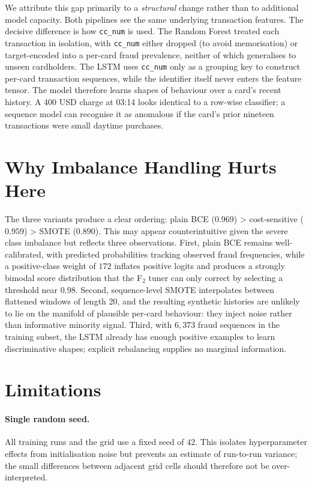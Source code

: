 \documentclass[oneside,12pt,parskip=half,american,numbers=noenddot]{scrreprt}
\begin{document}
We attribute this gap primarily to a \emph{structural} change rather than to additional model capacity. Both pipelines see the same underlying transaction features. The decisive difference is how \texttt{cc\_num} is used. The Random Forest treated each transaction in isolation, with \texttt{cc\_num} either dropped (to avoid memorisation) or target-encoded into a per-card fraud prevalence, neither of which generalises to unseen cardholders. The LSTM uses \texttt{cc\_num} only as a grouping key to construct per-card transaction sequences, while the identifier itself never enters the feature tensor. The model therefore learns shapes of behaviour over a card's recent history. A 400 USD charge at 03:14 looks identical to a row-wise classifier; a sequence model can recognise it as anomalous if the card's prior nineteen transactions were small daytime purchases.

\section{Why Imbalance Handling Hurts Here}
\label{sec:imbalance_discussion}

The three variants produce a clear ordering: plain BCE ($0.969$) > cost-sensitive ($0.959$) > SMOTE ($0.890$). This may appear counterintuitive given the severe class imbalance but reflects three observations. First, plain BCE remains well-calibrated, with predicted probabilities tracking observed fraud frequencies, while a positive-class weight of $172$ inflates positive logits and produces a strongly bimodal score distribution that the F\(_2\) tuner can only correct by selecting a threshold near $0.98$. Second, sequence-level SMOTE interpolates between flattened windows of length 20, and the resulting synthetic histories are unlikely to lie on the manifold of plausible per-card behaviour: they inject noise rather than informative minority signal. Third, with $6{,}373$ fraud sequences in the training subset, the LSTM already has enough positive examples to learn discriminative shapes; explicit rebalancing supplies no marginal information.

\section{Limitations}
\label{sec:limitations}

\paragraph{Single random seed.} All training runs and the grid use a fixed seed of $42$. This isolates hyperparameter effects from initialisation noise but prevents an estimate of run-to-run variance; the small differences between adjacent grid cells should therefore not be over-interpreted.
\end{document}
